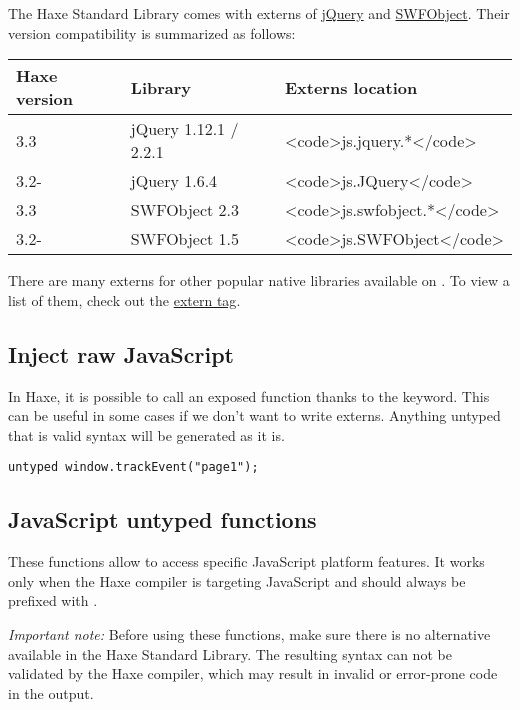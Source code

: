 The Haxe Standard Library comes with externs of \href{https://jquery.com/}{jQuery} and \href{http://blog.deconcept.com/swfobject/}{SWFObject}. Their version compatibility is summarized as follows:

\begin{center}
\begin{tabular}{| l | l | l |}
	\hline
	Haxe version & Library               & Externs location \\ \hline
	3.3          & jQuery 1.12.1 / 2.2.1 & <code>js.jquery.*</code> \\
	3.2-         & jQuery 1.6.4          & <code>js.JQuery</code> \\
	3.3          & SWFObject 2.3         & <code>js.swfobject.*</code> \\
	3.2-         & SWFObject 1.5         & <code>js.SWFObject</code> \\ \hline
\end{tabular}
\end{center}

There are many externs for other popular native libraries available on . To view a list of them, check out the \href{http://lib.haxe.org/t/extern/}{extern tag}.

\subsection{Inject raw JavaScript}
\label{target-javascript-injection}

In Haxe, it is possible to call an exposed function thanks to the  keyword. This can be useful in some cases if we don't want to write externs. Anything untyped that is valid syntax will be generated as it is.

\begin{lstlisting}
untyped window.trackEvent("page1");  
\end{lstlisting}


\subsection{JavaScript untyped functions}
\label{target-javascript-untyped}

These functions allow to access specific JavaScript platform features. It works only when the Haxe compiler is targeting JavaScript and should always be prefixed with . 

\emph{Important note:} Before using these functions, make sure there is no alternative available in the Haxe Standard Library. The resulting syntax can not be validated by the Haxe compiler, which may result in invalid or error-prone code in the output.


